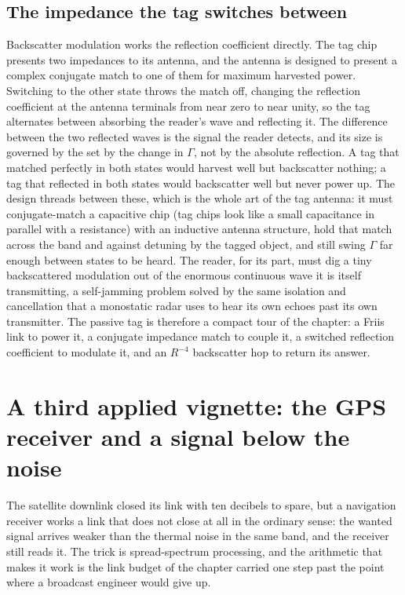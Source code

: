 \subsection{The impedance the tag switches between}

Backscatter modulation works the reflection coefficient directly. The tag
chip presents two impedances to its antenna, and the antenna is designed to
present a complex conjugate match to one of them for maximum harvested
power. Switching to the other state throws the match off, changing the
reflection coefficient at the antenna terminals from near zero to near
unity, so the tag alternates between absorbing the reader's wave and
reflecting it. The difference between the two reflected waves is the signal
the reader detects, and its size is governed by the  set by the change in $\Gamma$, not by the absolute
reflection. A tag that matched perfectly in both states would harvest well
but backscatter nothing; a tag that reflected in both states would
backscatter well but never power up. The design threads between these,
which is the whole art of the tag antenna: it must conjugate-match a
capacitive chip (tag chips look like a small capacitance in parallel with a
resistance) with an inductive antenna structure, hold that match across the
band and against detuning by the tagged object, and still swing $\Gamma$
far enough between states to be heard. The reader, for its part, must dig a
tiny backscattered modulation out of the enormous continuous wave it is
itself transmitting, a self-jamming problem solved by the same isolation
and cancellation that a monostatic radar uses to hear its own echoes past
its own transmitter. The passive tag is therefore a compact tour of the
chapter: a Friis link to power it, a conjugate impedance match to couple
it, a switched reflection coefficient to modulate it, and an $R^{-4}$
backscatter hop to return its answer.

\section{A third applied vignette: the GPS receiver and a signal
below the noise}

The satellite downlink closed its link with ten decibels to spare, but a
navigation receiver works a link that does not close at all in the ordinary
sense: the wanted signal arrives weaker than the thermal noise in the same
band, and the receiver still reads it. The trick is spread-spectrum
processing, and the arithmetic that makes it work is the link budget of the
chapter carried one step past the point where a broadcast engineer would
give up.

